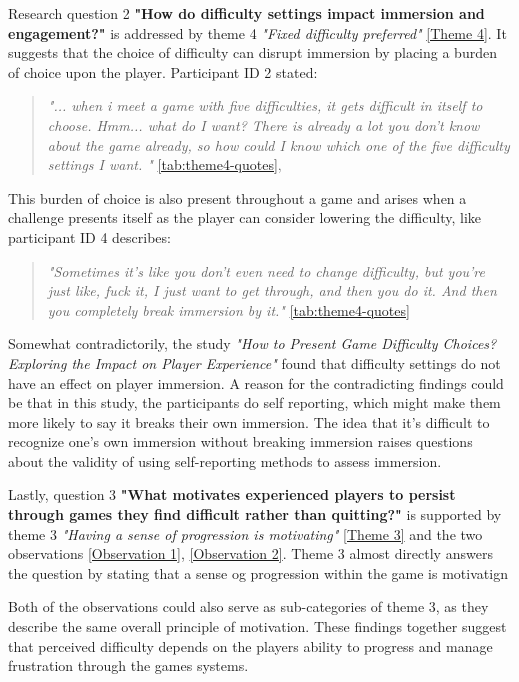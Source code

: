 Research question 2 \textbf{"How do difficulty settings impact immersion and engagement?"} is addressed by theme 4 \textit{"Fixed difficulty preferred"} \ref{Theme 4}. It suggests that the choice of difficulty can disrupt immersion by placing a burden of choice upon the player. Participant ID 2 stated:
\begin{quote}
    \textit{"... when i meet a game with five difficulties, it gets difficult in itself to choose. Hmm... what do I want? There is already a lot you don't know about the game already, so how could I know which one of the five difficulty settings I want. "} \ref{tab:theme4-quotes},
\end{quote}
This burden of choice is also present throughout a game and arises when a challenge presents itself as the player can consider lowering the difficulty, like participant ID 4 describes:
\begin{quote}
    \textit{"Sometimes it's like you don't even need to change difficulty, but you're just like, fuck it, I just want to get through, and then you do it. And then you completely break immersion by it."} \ref{tab:theme4-quotes}
\end{quote}
Somewhat contradictorily, the study \textit{"How to Present Game Difficulty Choices? Exploring the Impact on Player Experience"} \cite{jan_d_smeddinck_how_2016} found that difficulty settings do not have an effect on player immersion. A reason for the contradicting findings could be that in this study, the participants do self reporting, which might make them more likely to say it breaks their own immersion. The idea that it's difficult to recognize one's own immersion without breaking immersion raises questions about the validity of using self-reporting methods to assess immersion.

Lastly, question 3 \textbf{"What motivates experienced players to persist through games they find difficult rather than quitting?"} is supported by theme 3 \textit{"Having a sense of progression is motivating"} \ref{Theme 3} and the two observations \ref{Observation 1}, \ref{Observation 2}. Theme 3 almost directly answers the question by stating that a sense og progression within the game is motivatign

Both of the observations could also serve as sub-categories of theme 3, as they describe the same overall principle of motivation. These findings together suggest that perceived difficulty depends on the players ability to progress and manage frustration through the games systems. 

